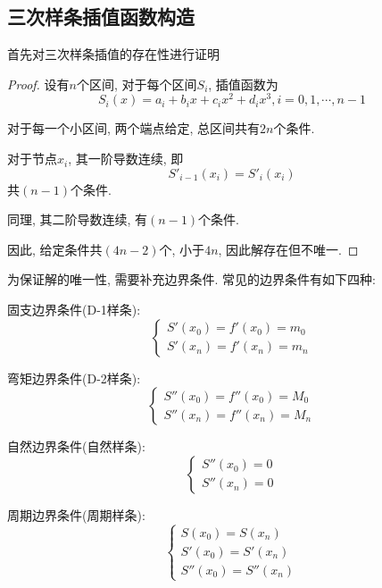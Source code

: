 \subsection{三次样条插值函数构造}

首先对三次样条插值的存在性进行证明

\begin{proof}
    设有$n$个区间, 对于每个区间$S_i$, 插值函数为
    \begin{equation*}
        S_i(x)=a_i+b_ix+c_ix^2+d_ix^3, i=0,1,\cdots,n-1
    \end{equation*}

    对于每一个小区间, 两个端点给定, 总区间共有$2n$个条件.

    对于节点$x_i$, 其一阶导数连续, 即
    \begin{equation*}
        S'_{i-1}(x_i)=S'_i(x_i)
    \end{equation*}
    共$(n-1)$个条件.

    同理, 其二阶导数连续, 有$(n-1)$个条件.

    因此, 给定条件共$(4n-2)$个, 小于$4n$, 因此解存在但不唯一.
\end{proof}

为保证解的唯一性, 需要补充边界条件. 常见的边界条件有如下四种:

固支边界条件(D-1样条):
\begin{equation*}
    \begin{cases}
        S'(x_0)=f'(x_0)=m_0\\
        S'(x_n)=f'(x_n)=m_n
    \end{cases}
\end{equation*}

弯矩边界条件(D-2样条):
\begin{equation*}
    \begin{cases}
        S''(x_0)=f''(x_0)=M_0\\
        S''(x_n)=f''(x_n)=M_n
    \end{cases}
\end{equation*}

自然边界条件(自然样条):
\begin{equation*}
    \begin{cases}
        S''(x_0)=0\\
        S''(x_n)=0
    \end{cases}
\end{equation*}

周期边界条件(周期样条):
\begin{equation*}
    \begin{cases}
        S(x_0)=S(x_n)\\
        S'(x_0)=S'(x_n)\\
        S''(x_0)=S''(x_n)
    \end{cases}
\end{equation*}

